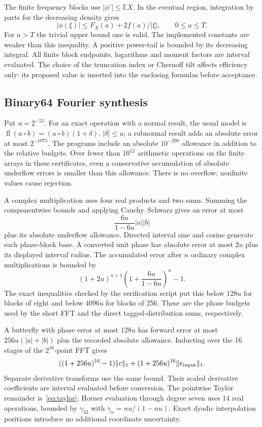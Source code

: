 \documentclass[11pt,a4paper]{article}
\theoremstyle{definition}\newtheorem{definition}[theorem]{Definition}
\theoremstyle{remark}\newtheorem{remark}[theorem]{Remark}
\newcommand{\E}{\mathbb E}\newcommand{\Prob}{\mathbb P}
\numberwithin{equation}{section}
\begin{document}
The finite frequency blocks use $|\phi'|\le\E X$. In the eventual region, integration by parts for the decreasing density gives
\[
 |\phi(\xi)|\le F_X(a)+2f(a)/|\xi|,\qquad 0\le a\le T.
\]
For $a>T$ the trivial upper bound one is valid. The implemented constants are weaker than this inequality. A positive power-tail is bounded by its decreasing integral. All finite block endpoints, logarithms and moment factors are interval evaluated. The choice of the truncation index or Chernoff tilt affects efficiency only: its proposed value is inserted into the enclosing formulas before acceptance.

\subsection{Binary64 Fourier synthesis}
Put $u=2^{-53}$. For an exact operation with a normal result, the usual model is
$\operatorname{fl}(a\mathbin\circ b)=(a\mathbin\circ b)(1+\delta)$, $|\delta|\le u$; a subnormal result adds an absolute error at most $2^{-1075}$. The programs include an absolute $10^{-290}$ allowance in addition to the relative budgets. Over fewer than $10^{12}$ arithmetic operations on the finite arrays in these certificates, even a conservative accumulation of absolute underflow errors is smaller than this allowance. There is no overflow; nonfinite values cause rejection.

A complex multiplication uses four real products and two sums. Summing the componentwise bounds and applying Cauchy--Schwarz gives an error at most
\[
 \frac{6u}{1-6u}|a||b|
\]
plus its absolute underflow allowance. Directed interval sine and cosine generate each phase-block base. A converted unit phase has absolute error at most $2u$ plus its displayed interval radius. The accumulated error after $n$ ordinary complex multiplications is bounded by
\[
 (1+2u)^{n+1}\left(1+\frac{6u}{1-6u}\right)^n-1.
\]
The exact inequalities checked by the verification script put this below $128u$ for blocks of eight and below $4096u$ for blocks of 256. These are the phase budgets used by the short FFT and the direct tagged-distribution sums, respectively.

A butterfly with phase error at most $128u$ has forward error at most
$256u(|a|+|b|)$ plus the recorded absolute allowance. Inducting over the 16 stages of the $2^{16}$-point FFT gives
\[
 ((1+256u)^{16}-1)\|c\|_1
 +(1+256u)^{16}\|e_{\rm input}\|_1.
\]
Separate derivative transforms use the same bound. Their scaled derivative coefficients are interval evaluated before conversion. The pointwise Taylor remainder is~\eqref{eq:taylor}; Horner evaluation through degree seven uses 14 real operations, bounded by $\gamma_{32}$ with $\gamma_n=nu/(1-nu)$. Exact dyadic interpolation positions introduce no additional coordinate uncertainty.
\end{document}
